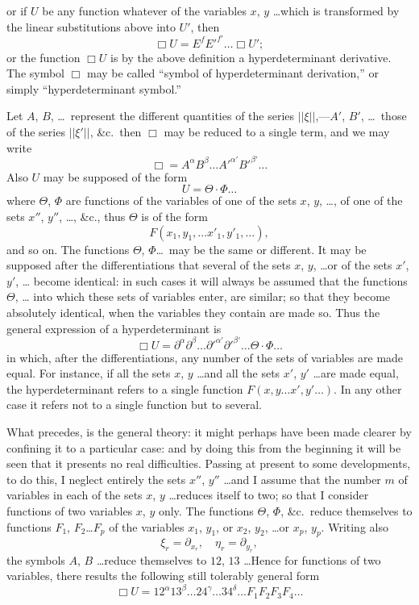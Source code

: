 \documentclass[11pt,a4paper]{book}
\begin{document}
\newpage
or if $U$ be any function whatever of the variables $x$, $y$ \ldots which is transformed by
the linear substitutions above into $U'$, then
\[
\Box U = E^f E'^{f'} \ldots \Box U';
\]
or the function $\Box U$ is by the above definition a hyperdeterminant derivative. The symbol $\Box$ may be called
``symbol of hyperdeterminant derivation,'' or simply ``hyperdeterminant symbol.''

Let $A$, $B$, \ldots\ represent the different quantities of the series $||\xi||$,---$A'$, $B'$, \ldots\ those of
the series $||\xi'||$, \&c.\ then $\Box$ may be reduced to a single term, and we may write
\[
\Box = A^{\alpha} B^{\beta} \ldots A'^{\alpha'} B'^{\beta'} \ldots
\]
Also $U$ may be supposed of the form
\[
U = \Theta \cdot \Phi \ldots
\]
where $\Theta$, $\Phi$ are functions of the variables of one of the sets $x$, $y$, \ldots, of one of the
sets $x''$, $y''$, \ldots, \&c., thus $\Theta$ is of the form
\[
F(x_1, y_1, \ldots x'_1, y'_1, \ldots),
\]
and so on. The functions $\Theta$, $\Phi$\ldots\ may be the same or different. It may be supposed
after the differentiations that several of the sets $x$, $y$, \ldots or of the sets $x'$, $y'$, \ldots
become identical: in such cases it will always be assumed that the functions $\Theta$, \ldots
into which these sets of variables enter, are similar; so that they become absolutely
identical, when the variables they contain are made so. Thus the general expression
of a hyperdeterminant is
\[
\Box U = \partial^{\alpha} \partial^{\beta} \ldots \partial'^{\alpha'} \partial'^{\beta'} \ldots \Theta \cdot \Phi \ldots
\]
in which, after the differentiations, any number of the sets of variables are made equal.
For instance, if all the sets $x$, $y$ \ldots and all the sets $x'$, $y'$ \ldots are made equal, the
hyperdeterminant refers to a single function $F(x, y \ldots x', y' \ldots)$. In any other case it
refers not to a single function but to several.

What precedes, is the general theory: it might perhaps have been made clearer
by confining it to a particular case: and by doing this from the beginning it will
be seen that it presents no real difficulties. Passing at present to some developments,
to do this, I neglect entirely the sets $x''$, $y''$ \ldots and I assume that the number $m$ of
variables in each of the sets $x$, $y$ \ldots reduces itself to two; so that I consider functions
of two variables $x$, $y$ only. The functions $\Theta$, $\Phi$, \&c.\ reduce themselves to functions
$F_1$, $F_2$\ldots $F_p$ of the variables $x_1$, $y_1$, or $x_2$, $y_2$, \ldots or $x_p$, $y_p$. Writing also
\[
\xi_r = \partial_{x_r}, \quad \eta_r = \partial_{y_r},
\]
the symbols $A$, $B$ \ldots reduce themselves to $12$, $13$ \ldots Hence for functions of two
variables, there results the following still tolerably general form
\[
\Box U = 12^{\alpha} 13^{\beta} \ldots 24^{\gamma} \ldots 34^{\delta} \ldots F_1 F_2 F_3 F_4 \ldots
\]
\end{document}
